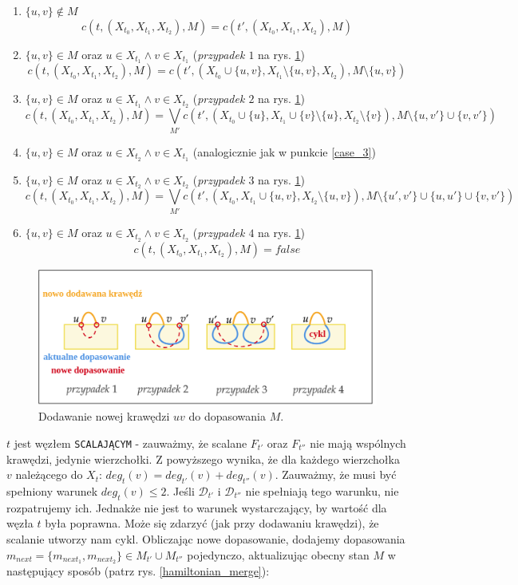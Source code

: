 \documentclass[12pt, oneside]{report}
\begin{document}
\begin{enumerate}
\item $\{u,v\} \notin M$
$$c(t, (X_{t_0}, X_{t_1}, X_{t_2}), M) = c(t', (X_{t_0}, X_{t_1}, X_{t_2}), M)$$
\item $\{u,v\} \in M$ oraz $u \in X_{t_1} \wedge v \in X_{t_1}$ (\emph{przypadek $1$} na rys. \ref{introduce_edge})
$$c(t, (X_{t_0}, X_{t_1}, X_{t_2}), M) = c(t', (X_{t_0} \cup \{u,v\}, X_{t_1} \setminus \{u,v\}, X_{t_2}), M \setminus \{u,v\})$$
\item \label{case_3}$\{u,v\} \in M$ oraz $u \in X_{t_1} \wedge v \in X_{t_2}$ (\emph{przypadek $2$} na rys. \ref{introduce_edge})
$$c(t, (X_{t_0}, X_{t_1}, X_{t_2}), M) = \bigvee_{M'} c(t', (X_{t_0} \cup \{u\}, X_{t_1} \cup \{v\} \setminus \{u\}, X_{t_2} \setminus \{v\}), M \setminus \{u,v'\} \cup \{v,v'\})$$
\item $\{u,v\} \in M$ oraz $u \in X_{t_2} \wedge v \in X_{t_1}$ (analogicznie jak w punkcie \ref{case_3})
\item $\{u,v\} \in M$ oraz $u \in X_{t_2} \wedge v \in X_{t_2}$ (\emph{przypadek $3$} na rys. \ref{introduce_edge})
$$c(t, (X_{t_0}, X_{t_1}, X_{t_2}), M) = \bigvee_{M'} c(t', (X_{t_0}, X_{t_1} \cup \{u,v\}, X_{t_2} \setminus \{u,v\}), M \setminus \{u',v'\} \cup \{u,u'\} \cup \{v,v'\})$$
\item $\{u,v\} \in M$ oraz $u \in X_{t_2} \wedge v \in X_{t_2}$ (\emph{przypadek $4$} na rys. \ref{introduce_edge})
$$c(t, (X_{t_0}, X_{t_1}, X_{t_2}), M) = false$$
\end{enumerate}

\begin{figure}
\centering
\includegraphics[width=16cm]{introduce_edge.png}
\caption{Dodawanie nowej krawędzi $uv$ do dopasowania $M$.}
\label{introduce_edge}
\end{figure}
$$$$
$t$ jest węzłem \texttt{SCALAJĄCYM} - zauważmy, że scalane $F_{t'}$ oraz $F_{t''}$ nie mają wspólnych krawędzi, jedynie wierzchołki. Z powyższego wynika, że dla każdego wierzchołka $v$ należącego do $X_t$: $deg_t(v) = deg_{t'}(v) + deg_{t''}(v)$. Zauważmy, że musi być spełniony warunek $deg_t(v) \leq 2$. Jeśli $\mathcal{D}_{t'}$ i $\mathcal{D}_{t''}$ nie spełniają tego warunku, nie rozpatrujemy ich. Jednakże nie jest to warunek wystarczający, by wartość dla węzła $t$ była poprawna. Może się zdarzyć (jak przy dodawaniu krawędzi), że scalanie utworzy nam cykl. Obliczając nowe dopasowanie, dodajemy dopasowania $m_{next} = \{m_{next_1}, m_{next_2}\} \in M_{t'} \cup M_{t''}$ pojedynczo, aktualizując obecny stan $M$ w następujący sposób (patrz rys. \ref{hamiltonian_merge}):
\end{document}
